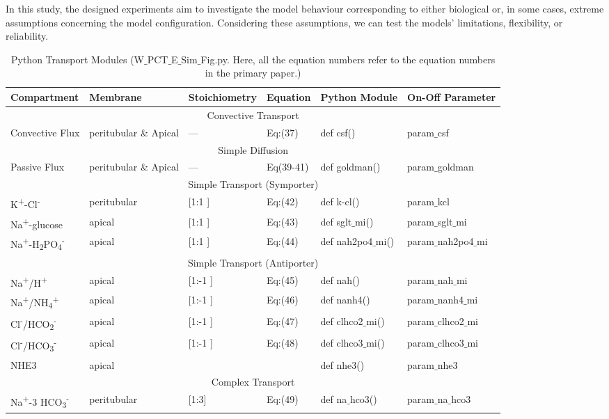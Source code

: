 \documentclass[fleqn,10pt]{physiome}
\begin{document}
In this study, the designed experiments aim to investigate the model behaviour corresponding to either biological or, in some cases, extreme assumptions concerning the model configuration. Considering these assumptions, we can test the models' limitations, flexibility, or reliability. 
\begin{table}[]
\caption{Python Transport Modules (W$\_$PCT$\_$E$\_$Sim$\_$Fig.py. Here, all the equation numbers refer to the equation numbers in the primary paper.)}
\centering
\begin{tabular}{p{2.2cm} p{1.6cm} p{1.8cm} p{1.8cm} p{2.7cm} p{2.8cm}}
\hline
Compartment & Membrane & Stoichiometry & Equation &  Python Module & On-Off Parameter  \\
\hline
\multicolumn{6}{c}{Convective Transport}\\
Convective Flux & peritubular \& Apical & --- & Eq:(37) & def csf()& param$\_$csf\\
\hline
\multicolumn{6}{c}{Simple Diffusion}\\
Passive Flux & peritubular \& Apical & --- &  Eq(39-41)&  def goldman() & param$\_$goldman\\
\hline
\multicolumn{6}{c}{Simple Transport (Symporter)}\\
K\textsuperscript{+}-Cl\textsuperscript{-}& peritubular&  [1:1 ]& Eq:(42) & def k-cl()& param$\_$kcl\\

Na\textsuperscript{+}-glucose &  apical&  [1:1 ]& Eq:(43) & def sglt$\_$mi()& param$\_$sglt$\_$mi\\
Na\textsuperscript{+}-H\textsubscript{2}PO\textsubscript{4}\textsuperscript{-}&  apical&  [1:1 ]& Eq:(44) & def nah2po4$\_$mi()& param$\_$nah2po4$\_$mi\\

\multicolumn{6}{c}{Simple Transport (Antiporter)}\\
Na\textsuperscript{+}/H\textsuperscript{+}&  apical&  [1:-1 ]& Eq:(45) & def nah()& param$\_$nah$\_$mi\\
Na\textsuperscript{+}/NH\textsubscript{4}\textsuperscript{+}&  apical&  [1:-1 ]& Eq:(46) & def nanh4()& param$\_$nanh4$\_$mi\\

Cl\textsuperscript{-}/HCO\textsubscript{2}\textsuperscript{-} &  apical&  [1:-1 ]& Eq:(47) & def clhco2$\_$mi()& param$\_$clhco2$\_$mi\\
Cl\textsuperscript{-}/HCO\textsubscript{3}\textsuperscript{-} &  apical&  [1:-1 ]& Eq:(48) & def clhco3$\_$mi()& param$\_$clhco3$\_$mi\\
NHE3 & apical & \cite{weinstein_kinetically_1995} &  \cite{weinstein_kinetically_1995}& def nhe3() &param$\_$nhe3\\
\multicolumn{6}{c}{Complex Transport}\\
Na\textsuperscript{+}-3 HCO\textsubscript{3}\textsuperscript{-} & peritubular&  [1:3]& Eq:(49) & def na$\_$hco3()& param$\_$na$\_$hco3\\


\end{tabular}
\end{table}
\end{document}

